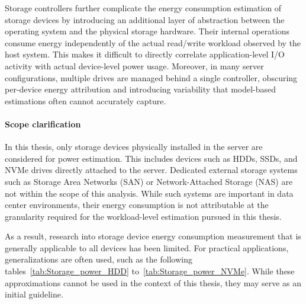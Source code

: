 Storage controllers further complicate the energy consumption estimation of storage devices by introducing an additional layer of abstraction between the operating system and the physical storage hardware. Their internal operations consume energy independently of the actual read/write workload observed by the host system. This makes it difficult to directly correlate application-level I/O activity with actual device-level power usage. Moreover, in many server configurations, multiple drives are managed behind a single controller, obscuring per-device energy attribution and introducing variability that model-based estimations often cannot accurately capture.

\paragraph{Scope clarification} 
In this thesis, only storage devices physically installed in the server are considered for power estimation. This includes devices such as HDDs, SSDs, and NVMe drives directly attached to the server. Dedicated external storage systems such as Storage Area Networks (SAN) or Network-Attached Storage (NAS) are not within the scope of this analysis. While such systems are important in data center environments, their energy consumption is not attributable at the granularity required for the workload-level estimation pursued in this thesis.

As a result, research into storage device energy consumption measurement that is generally applicable to all devices has been limited. For practical applications, generalizations are often used, such as the following tables~\ref{tab:Storage_power_HDD} to~\ref{tab:Storage_power_NVMe}. While these approximations cannot be used in the context of this thesis, they may serve as an initial guideline.

